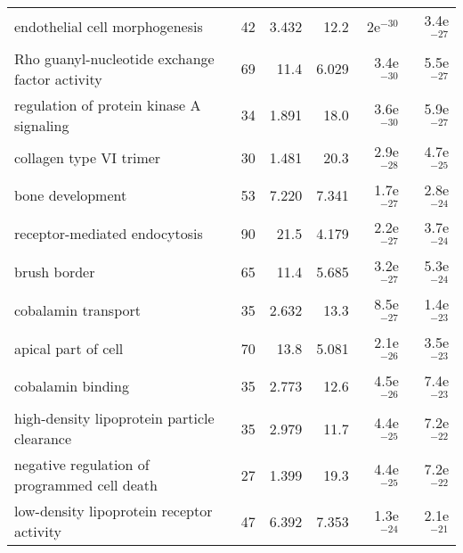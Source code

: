 \begin{longtable}{lrrrrr}
                    endothelial cell morphogenesis &                      42 &                   3.432 &       12.2 &           2e$^{-30}$ &         3.4e$^{-27}$ \\
    Rho guanyl-nucleotide exchange factor activity &                      69 &                    11.4 &      6.029 &         3.4e$^{-30}$ &         5.5e$^{-27}$ \\
          regulation of protein kinase A signaling &                      34 &                   1.891 &       18.0 &         3.6e$^{-30}$ &         5.9e$^{-27}$ \\
                           collagen type VI trimer &                      30 &                   1.481 &       20.3 &         2.9e$^{-28}$ &         4.7e$^{-25}$ \\
                                  bone development &                      53 &                   7.220 &      7.341 &         1.7e$^{-27}$ &         2.8e$^{-24}$ \\
                     receptor-mediated endocytosis &                      90 &                    21.5 &      4.179 &         2.2e$^{-27}$ &         3.7e$^{-24}$ \\
                                      brush border &                      65 &                    11.4 &      5.685 &         3.2e$^{-27}$ &         5.3e$^{-24}$ \\
                               cobalamin transport &                      35 &                   2.632 &       13.3 &         8.5e$^{-27}$ &         1.4e$^{-23}$ \\
                               apical part of cell &                      70 &                    13.8 &      5.081 &         2.1e$^{-26}$ &         3.5e$^{-23}$ \\
                                 cobalamin binding &                      35 &                   2.773 &       12.6 &         4.5e$^{-26}$ &         7.4e$^{-23}$ \\
       high-density lipoprotein particle clearance &                      35 &                   2.979 &       11.7 &         4.4e$^{-25}$ &         7.2e$^{-22}$ \\
      negative regulation of programmed cell death &                      27 &                   1.399 &       19.3 &         4.4e$^{-25}$ &         7.2e$^{-22}$ \\
         low-density lipoprotein receptor activity &                      47 &                   6.392 &      7.353 &         1.3e$^{-24}$ &         2.1e$^{-21}$ \\

\end{longtable}
